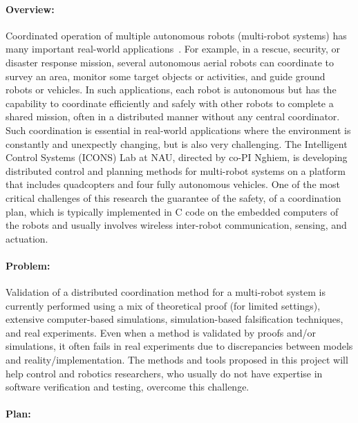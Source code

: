 
\paragraph{Overview:}

Coordinated operation of multiple autonomous robots (multi-robot systems) has many important real-world applications~\cite{multirobot2005,multirobotsurvey2013}.
For example, in a rescue, security, or disaster response mission, several autonomous aerial robots can coordinate to survey an area, monitor some target objects or activities, and guide ground robots or vehicles.
In such applications, each robot is autonomous but has the capability to coordinate efficiently and safely with other robots to complete a shared mission, often in a distributed manner without any central coordinator.
Such coordination is essential in real-world applications where the environment is constantly and unexpectly changing, but is also very challenging.
The Intelligent Control Systems (ICONS) Lab at NAU, directed by co-PI Nghiem, is developing distributed control and planning methods for multi-robot systems on a platform that includes quadcopters and four fully autonomous vehicles.
One of the most critical challenges of this research the guarantee of the safety, of a coordination plan, which is typically implemented in C code on the embedded computers of the robots and usually involves wireless inter-robot communication, sensing, and actuation.

\paragraph{Problem:}

Validation of a distributed coordination method for a multi-robot system is currently performed using a mix of theoretical proof (for limited settings), extensive computer-based simulations, simulation-based falsification techniques, and real experiments.
Even when a method is validated by proofs and/or simulations, it often fails in real experiments due to discrepancies between models and reality/implementation.
The methods and tools proposed in this project will help control and robotics researchers, who usually do not have expertise in software verification and testing, overcome this challenge.


\paragraph{Plan:}

